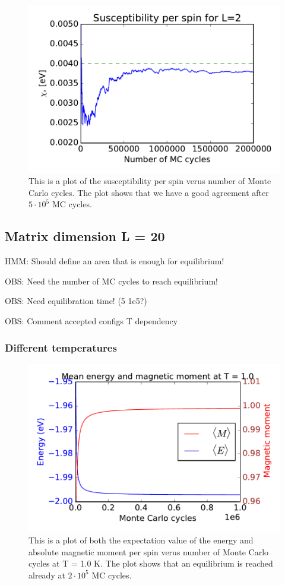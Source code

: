 \begin{figure}[H]
\includegraphics[width=\linewidth]{../results/4b/L_2_susceptibility}\caption{This is a plot of the susceptibility per spin verus number of Monte Carlo cycles. The plot shows that we have a good agreement after $ 5 \cdot 10^{5} $ MC cycles.}\label{fig:L_2_susceptibility}
\end{figure}

\subsection{Matrix dimension L = 20}

HMM: Should define an area that is enough for equilibrium!

OBS: Need the number of MC cycles to reach equilibrium!

OBS: Need equilibration time! (5 1e5?)

OBS: Comment accepted configs T dependency

\subsubsection{Different temperatures}
\begin{figure}[H]
\includegraphics[width=\linewidth]{../results/4c/En_mag_T1_0}\caption{This is a plot of both the expectation value of the energy and absolute magnetic moment per spin verus number of Monte Carlo cycles at T = 1.0 K. The plot shows that an equilibrium is reached already at $2 \cdot 10^{5}$ MC cycles.}\label{fig:L_20_energy_mag_T_1.0}
\end{figure}

